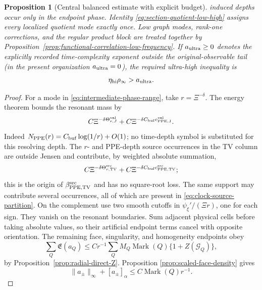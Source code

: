 \documentclass[11pt]{article}
\newtheorem{proposition}[theorem]{Proposition}
\begin{document}
\begin{proposition}[Central balanced estimate with explicit budget]
induced depths occur only in the endpoint phase.  Identity
\eqref{eq:section-quotient-low-high} assigns every localized quotient mode
exactly once.  Low graph modes, rank-one corrections, and
the regular product block are treated together by
Proposition~\ref{prop:functional-correlation-low-frequency}.  If
$a_{\rm ultra}\ge0$ denotes the explicitly recorded time-complexity exponent
outside the original-observable tail (in the present organization
$a_{\rm ultra}=0$), the required ultra-high inequality is
\begin{equation}
\label{eq:ultra-high-exponent-window}
 \eta_{\rm hi}\rho_\infty>a_{\rm ultra}.
\end{equation}
\end{proposition}

\begin{proof}
For a mode in \eqref{eq:intermediate-phase-range}, take
\(r=\Xi^{-\delta}\).  The energy theorem bounds the resonant mass by
\begin{equation}
\label{eq:phase-energy-all-tails}
 C\Xi^{-\delta\Theta_{r,J}^{\rm val}}
 +C\Xi^{-\delta C_{\rm buf}c_{\rm PPE,J}^{\rm val}}.
\end{equation}
Indeed $N_{\rm PPE}(r)=C_{\rm buf}\log(1/r)+O(1)$; no time-depth symbol is
substituted for this resolving depth.  The $r$- and PPE-depth source
occurrences in the TV column are outside Jensen and contribute, by weighted
absolute summation,
\begin{equation}
\label{eq:phase-PPE-TV-tails}
 C\Xi^{-\delta\Theta_{r,\rm TV}^{\rm src}}
 +C\Xi^{-\delta C_{\rm buf}c_{\rm PPE,TV}^{\rm src}};
\end{equation}
this is the origin of $\beta_{\rm PPE,TV}^{\rm src}$ and has no square-root
loss.  The same support may contribute several occurrences, all of which are
present in \eqref{eq:clock-source-partition}.
On the complement use two smooth
cutoffs in
\(\psi_\xi'/(\Xi r)\), one for each sign.  They vanish on the resonant
boundaries.  Sum adjacent physical cells before taking absolute values, so
their artificial endpoint terms cancel with opposite orientation.  The
remaining face, singularity, and homogeneity endpoints obey
\begin{equation}
\label{eq:phase-endpoint-ledger}
 \sum_Q\mathfrak E(a_Q)
 \le Cr^{-1}\sum_QM_Q\operatorname{Mark}(Q)
       \{1+Z(\mathcal G_Q)\},
\end{equation}
by Proposition~\ref{prop:radial-direct-Z}.  Proposition
\ref{prop:scaled-face-density} gives
\[
 \|a_\pm\|_\infty+[a_\pm]_\alpha
 \le C\operatorname{Mark}(Q) r^{-1}.
\]
\end{proof}
\end{document}
